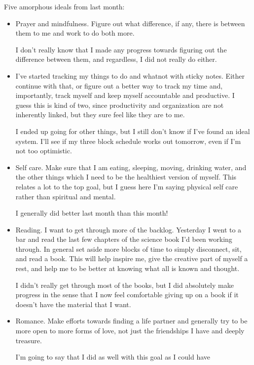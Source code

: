 \documentclass[12pt]{article}
\renewcommand{\,}{\textsuperscript{,}}
\begin{document}
Five amorphous ideals from last month:  
\begin{itemize}  
\item Prayer and mindfulness. Figure out what difference, if any, there is between them to me and work to do both more.

I don't really know that I made any progress towards figuring out the difference between them, and regardless, I did not really do either.

\item I've started tracking my things to do and whatnot with sticky notes. Either continue with that, or figure out a better way to track my time and, importantly, track myself and keep myself accountable and productive. I guess this is kind of two, since productivity and organization are not inherently linked, but they sure feel like they are to me.

I ended up going for other things, but I still don't know if I've found an ideal system. I'll see if my three block schedule works out tomorrow, even if I'm not too optimistic.

\item Self care. Make sure that I am eating, sleeping, moving, drinking water, and the other things which I need to be the healthiest version of myself. This relates a lot to the top goal, but I guess here I'm saying physical self care rather than spiritual and mental.

I generally did better last month than this month!

\item Reading. I want to get through more of the backlog. Yesterday I went to a bar and read the last few chapters of the science book I'd been working through. In general set aside more blocks of time to simply disconnect, sit, and read a book. This will help inspire me, give the creative part of myself a rest, and help me to be better at knowing what all is known and thought.

I didn't really get through most of the books, but I did absolutely make progress in the sense that I now feel comfortable giving up on a book if it doesn't have the material that I want.

\item Romance. Make efforts towards finding a life partner and generally try to be more open to more forms of love, not just the friendships I have and deeply treasure.

I'm going to say that I did as well with this goal as I could have

\end{itemize}
\end{document}
